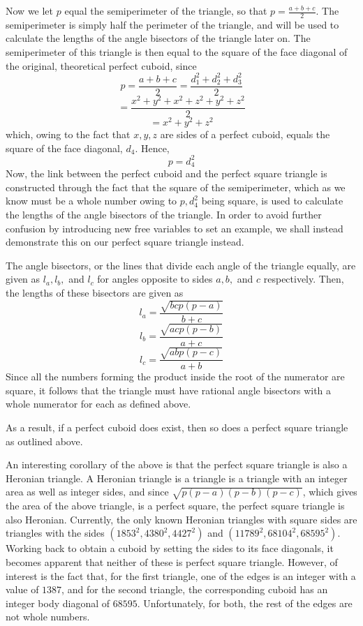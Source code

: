 \documentclass[11pt]{article}
\begin{document}
Now we let $p$ equal the semiperimeter of the triangle, so that $p=\frac{a+b+c}{2}$. The semiperimeter is simply half the perimeter of the triangle, and will be used to calculate the lengths of the angle bisectors of the triangle later on. The semiperimeter of this triangle is then equal to the square of the face diagonal of the original, theoretical perfect cuboid, since
$$p=\frac{a+b+c}{2}=\frac{d_1^2+d_2^2+d_3^2}{2}$$
$$=\frac{x^2+y^2+x^2+z^2+y^2+z^2}{2}$$
$$=x^2+y^2+z^2$$
which, owing to the fact that $x, y, z$ are sides of a perfect cuboid, equals the square of the face diagonal, $d_4$. Hence,
$$p=d_4^2$$
Now, the link between the perfect cuboid and the perfect square triangle is constructed through the fact that the square of the semiperimeter, which as we know must be a whole number owing to $p, d_4^2$ being square, is used to calculate the lengths of the angle bisectors of the triangle. In order to avoid further confusion by introducing new free variables to set an example, we shall instead demonstrate this on our perfect square triangle instead. 

The angle bisectors, or the lines that divide each angle of the triangle equally, are given as $l_a, l_b,$ and $l_c$ for angles opposite to sides $a, b,$ and $c$ respectively. Then, the lengths of these bisectors are given as
$$l_a=\frac{\sqrt{bcp(p-a)}}{b+c}$$
$$l_b=\frac{\sqrt{acp(p-b)}}{a+c}$$
$$l_c=\frac{\sqrt{abp(p-c)}}{a+b}$$
Since all the numbers forming the product inside the root of the numerator are square, it follows that the triangle must have rational angle bisectors with a whole numerator for each as defined above.

As a result, if a perfect cuboid does exist, then so does a perfect square triangle as outlined above.

An interesting corollary of the above is that the perfect square triangle is also a Heronian triangle. A Heronian triangle is a triangle is a triangle with an integer area as well as integer sides, and since $\sqrt{p(p-a)(p-b)(p-c)}$, which gives the area of the above triangle, is a perfect square, the perfect square triangle is also Heronian. Currently, the only known Heronian triangles with square sides are triangles with the sides $(1853^2, 4380^2, 4427^2)$ and $(11789^2, 68104^2, 68595^2)$. Working back to obtain a cuboid by setting the sides to its face diagonals, it becomes apparent that neither of these is perfect square triangle. However, of interest is the fact that, for the first triangle, one of the edges is an integer with a value of $1387$, and for the second triangle, the corresponding cuboid has an integer body diagonal of $68595$. Unfortunately, for both, the rest of the edges are not whole numbers. 
\end{document}
